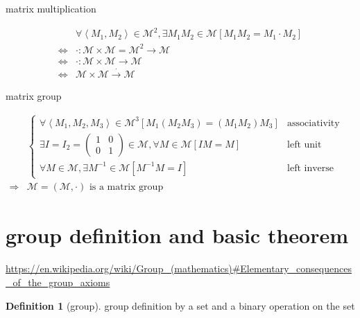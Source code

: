 \documentclass[
]{book}
\theoremstyle{definition}
\newtheorem{definition}{Definition}[chapter]
\theoremstyle{definition}
\theoremstyle{definition}
\theoremstyle{definition}
\theoremstyle{remark}
\begin{document}
matrix multiplication

\[
\begin{aligned}
 & \forall\left\langle M_{{\scriptscriptstyle 1}},M_{{\scriptscriptstyle 2}}\right\rangle \in\mathcal{M}^{2},\exists M_{{\scriptscriptstyle 1}}M_{{\scriptscriptstyle 2}}\in\mathcal{M}\left[M_{{\scriptscriptstyle 1}}M_{{\scriptscriptstyle 2}}=M_{{\scriptscriptstyle 1}}\cdot M_{{\scriptscriptstyle 2}}\right]\\
\Leftrightarrow & \cdot:\mathcal{M}\times\mathcal{M}=\mathcal{M}^{2}\rightarrow\mathcal{M}\\
\Leftrightarrow & \cdot:\mathcal{M}\times\mathcal{M}\rightarrow\mathcal{M}\\
\Leftrightarrow & \mathcal{M}\times\mathcal{M}\overset{\cdot}{\rightarrow}\mathcal{M}
\end{aligned}
\]

matrix group

\[
\begin{aligned}
 & \begin{cases}
\forall\left\langle M_{{\scriptscriptstyle 1}},M_{{\scriptscriptstyle 2}},M_{{\scriptscriptstyle 3}}\right\rangle \in\mathcal{M}^{3}\left[M_{{\scriptscriptstyle 1}}\left(M_{{\scriptscriptstyle 2}}M_{{\scriptscriptstyle 3}}\right)=\left(M_{{\scriptscriptstyle 1}}M_{{\scriptscriptstyle 2}}\right)M_{{\scriptscriptstyle 3}}\right] & \text{associativity}\\
\exists I=I_{2}=\begin{pmatrix}1 & 0\\
0 & 1
\end{pmatrix}\in\mathcal{M},\forall M\in\mathcal{M}\left[IM=M\right] & \text{left unit element}\\
\forall M\in\mathcal{M},\exists M^{-1}\in\mathcal{M}\left[M^{-1}M=I\right] & \text{left inverse (element)}
\end{cases}\\
\Rightarrow & \mathcal{M}=\left(\mathcal{M},\cdot\right)\text{ is a matrix group}
\end{aligned}
\]

\section{group definition and basic theorem}\label{group-definition-and-basic-theorem}

\url{https://en.wikipedia.org/wiki/Group_(mathematics)\#Elementary_consequences_of_the_group_axioms}

\begin{definition}[group]
\protect\hypertarget{def:unnamed-chunk-1}{}\label{def:unnamed-chunk-1}group definition by a set and a binary operation on the set
\end{definition}
\end{document}
